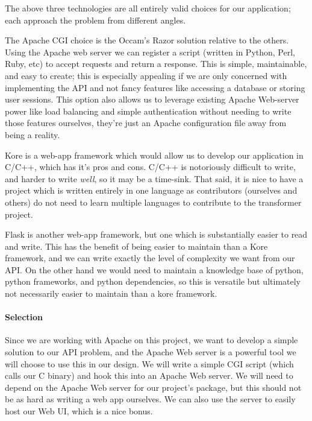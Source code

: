 The above three technologies are all entirely valid choices for our application; each approach the problem from different angles.

The Apache CGI choice is the Occam's Razor solution relative to the others.
Using the Apache web server we can register a script (written in Python, Perl, Ruby, etc) to accept requests and return a response.
This is simple, maintainable, and easy to create; this is especially appealing if we are only concerned with implementing the API and not fancy features like accessing a database or storing user sessions.
This option also allows us to leverage existing Apache Web-server power like load balancing and simple authentication without needing to write those features ourselves, they're just an Apache configuration file away from being a reality.

Kore is a web-app framework which would allow us to develop our application in C/C++, which has it's pros and cons.
C/C++ is notoriously difficult to write, and harder to write \textit{well}, so it may be a time-sink.
That said, it is nice to have a project which is written entirely in one language as contributors (ourselves and others) do not need to learn multiple languages to contribute to the transformer project.

Flask is another web-app framework, but one which is substantially easier to read and write.
This has the benefit of being easier to maintain than a Kore framework, and we can write exactly the level of complexity we want from our API.
On the other hand we would need to maintain a knowledge base of python, python frameworks, and python dependencies, so this is versatile but ultimately not necessarily easier to maintain than a kore framework.

\paragraph{Selection}

Since we are working with Apache on this project, we want to develop a simple solution to our API problem, and the Apache Web server is a powerful tool we will choose to use this in our design.
We will write a simple CGI script (which calls our C binary) and hook this into an Apache Web server.
We will need to depend on the Apache Web server for our project's package, but this should not be as hard as writing a web app ourselves.
We can also use the server to easily host our Web UI, which is a nice bonus.
